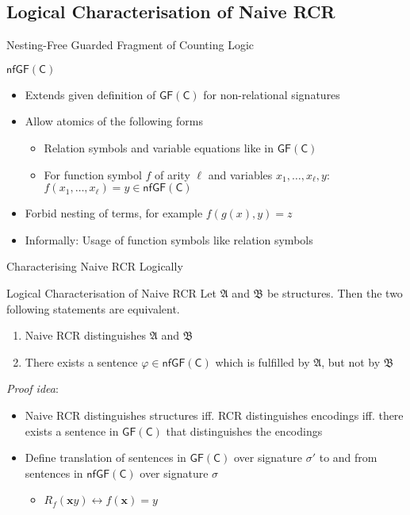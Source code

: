 \documentclass[aspectratio=169]{beamer}
\newcommand{\GFC}{\mathsf{GF}(\mathsf{C})}
\renewcommand{\phi}{\varphi}
\begin{document}
	\subsection{Logical Characterisation of Naive RCR}
	
	\begin{frame}{Nesting-Free Guarded Fragment of Counting Logic}
		\begin{block}{$\mathsf{nfGF}(\mathsf C)$}
			\begin{itemize}
				\item Extends given definition of $\GFC$ for non-relational signatures
				\item Allow atomics of the following forms
				\begin{itemize}
					\item Relation symbols and variable equations like in $\GFC$
					\item For function symbol $f$ of arity $\ell$ and variables $x_1,\dots,x_\ell,y$: $f(x_1,\dots,x_\ell)=y\in \mathsf{nfGF}(\mathsf C)$
				\end{itemize}
			\end{itemize}
		\end{block}
		\begin{itemize}
			\item Forbid nesting of terms, for example $f(g(x),y)=z$
			\item Informally: Usage of function symbols like relation symbols
		\end{itemize}
	\end{frame}
	
	\begin{frame}{Characterising Naive RCR Logically}
		\begin{block}{Logical Characterisation of Naive RCR}
			Let $\mathfrak A$ and $\mathfrak B$ be structures.
			Then the two following statements are equivalent.
			\begin{enumerate}
				\item Naive RCR distinguishes $\mathfrak A$ and $\mathfrak B$
				\item There exists a sentence $\phi\in\mathsf{nfGF}(\mathsf C)$ which is fulfilled by $\mathfrak A$, but not by $\mathfrak B$
			\end{enumerate}
		\end{block}
		\emph{Proof idea}:
		\begin{itemize}
			\item Naive RCR distinguishes structures iff. RCR distinguishes encodings iff. there exists a sentence in $\GFC$ that distinguishes the encodings
			\item Define translation of sentences in $\GFC$ over signature $\sigma'$ to and from sentences in $\mathsf{nfGF}(\mathsf C)$ over signature $\sigma$
			\begin{itemize}
				\item $R_f(\mathbf xy) \leftrightarrow f(\mathbf x)=y$
			\end{itemize}
		\end{itemize}
	\end{frame}
	
\end{document}
